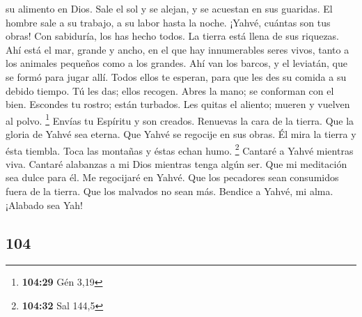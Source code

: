 \begin{paracol}{2}
su alimento en Dios.  Sale el sol y se alejan, y se
acuestan en sus guaridas.  El hombre sale a su trabajo, a
su labor hasta la noche.  ¡Yahvé, cuántas son tus obras!
Con sabiduría, los has hecho todos. La tierra está llena de sus
riquezas.  Ahí está el mar, grande y ancho, en el que hay
innumerables seres vivos, tanto a los animales pequeños como a los
grandes.  Ahí van los barcos, y el leviatán, que se formó
para jugar allí.  Todos ellos te esperan, para que les
des su comida a su debido tiempo.  Tú les das; ellos
recogen. Abres la mano; se conforman con el bien. 
Escondes tu rostro; están turbados. Les quitas el aliento; mueren y
vuelven al polvo. \footnote{\textbf{104:29} Gén 3,19} 
Envías tu Espíritu y son creados. Renuevas la cara de la tierra.
 Que la gloria de Yahvé sea eterna. Que Yahvé se regocije
en sus obras.  Él mira la tierra y ésta tiembla. Toca las
montañas y éstas echan humo. \footnote{\textbf{104:32} Sal 144,5}
 Cantaré a Yahvé mientras viva. Cantaré alabanzas a mi
Dios mientras tenga algún ser.  Que mi meditación sea
dulce para él. Me regocijaré en Yahvé.  Que los pecadores
sean consumidos fuera de la tierra. Que los malvados no sean más.
Bendice a Yahvé, mi alma. ¡Alabado sea Yah!

\switchcolumn
\begin{otherlanguage}{english}

\hypertarget{section-207}{%
\section{104}\label{section-207}}


\end{otherlanguage}
\end{paracol}
